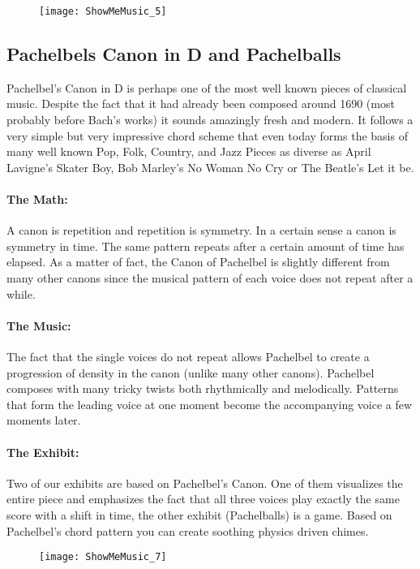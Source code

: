 \begin{figure}[h]
\centering
\texttt{[image: ShowMeMusic\_5]}
\end{figure}


\subsection{Pachelbels Canon in D and Pachelballs}
Pachelbel's Canon in D is perhaps one of the most well known pieces of classical music. Despite the fact that it had already been composed around 1690 (most probably before Bach's works) it sounds amazingly fresh and modern. It follows a very simple but very impressive chord scheme that even today forms the basis of many well known Pop, Folk, Country, and Jazz Pieces as diverse as April Lavigne's Skater Boy, Bob Marley's No Woman No Cry or The Beatle's Let it be.

\paragraph{The Math:} A canon is repetition and repetition is symmetry. In a certain sense a canon is symmetry in time. The same pattern repeats after a certain amount of time has elapsed. As a matter of fact, the Canon of Pachelbel is slightly different from many other canons since the musical pattern of each voice does not repeat after a while.

\paragraph{The Music:} The fact that the single voices do not repeat allows Pachelbel to create a progression of density in the canon (unlike many other canons). Pachelbel composes with many tricky twists both rhythmically and melodically. Patterns that form the leading voice at one moment become the accompanying voice a few moments later.  

\paragraph{The Exhibit:} Two of our exhibits are based on Pachelbel's Canon. One of them visualizes the entire piece and emphasizes the fact that all three voices play exactly the same score with a shift in time, the other exhibit (Pachelballs) is a game. Based on Pachelbel's chord pattern you can create soothing physics driven chimes. 

\begin{figure}
\centering
\texttt{[image: ShowMeMusic\_7]}
\end{figure}


